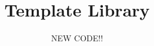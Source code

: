 \documentclass[a4paper,11pt]{article}
\author{NEW CODE!!}
\title{Template Library}
\begin{document}
 
	\maketitle %
	\newpage %
	\newpage
	\tableofcontents %
	\newpage
	
	\twocolumn
	
	
	
	
	
	
	
\end{document}
